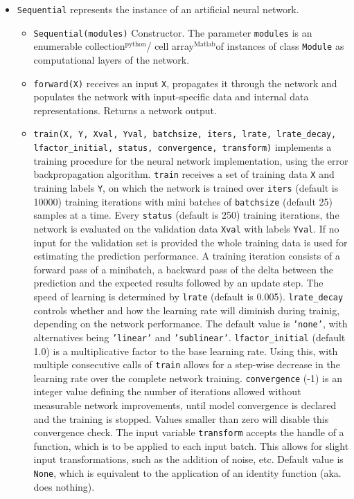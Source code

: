 \documentclass[a4wide]{article}
\newcommand{\mat}{$^\text{Matlab}$}
\newcommand{\py}{$^\text{python}$}
\begin{document}
\begin{itemize}
\begin{itemize}
		\item \texttt{Sequential} represents the instance of an artificial neural network.
			\begin{itemize}
				\item \texttt{Sequential(modules)} Constructor. The parameter \texttt{modules} is an enumerable collection\py / cell array\mat of instances of class \texttt{Module} as computational layers of the network.

				\item \texttt{forward(X)} receives an input \texttt{X}, propagates it through the network and populates the network with input-specific data and internal data representations. Returns a network output.

				\item \texttt{train(X, Y, Xval, Yval, batchsize, iters, lrate, lrate\_decay, lfactor\_initial, status, convergence, transform)} implements a training procedure for the neural network implementation, using the error backpropagation algorithm. \texttt{train} receives a set of training data \texttt{X}		 and training labels  \texttt{Y},   on which the network is trained over \texttt{iters} (default is 10000) training iterations with mini batches of \texttt{batchsize} (default 25) samples at a time. Every \texttt{status} (default is 250) training iterations, the network is evaluated on the validation data \texttt{Xval} with labels \texttt{Yval}. If no input for the validation set is provided the whole training data is used for estimating the prediction performance. A training iteration consists of a forward pass of a minibatch, a backward pass of the delta between the prediction and the expected results followed by an update step. The speed of learning is determined by \texttt{lrate} (default is 0.005). \texttt{lrate\_decay} controls whether and how the learning rate will diminish during trainig, depending on the network performance. The default value is \texttt{'none'}, with alternatives being \texttt{'linear'} and \texttt{'sublinear'}. \texttt{lfactor\_initial} (default 1.0) is a multiplicative factor to the base learning rate. Using this, with multiple consecutive calls of \texttt{train} allows for a step-wise decrease in the learning rate over the complete network training. \texttt{convergence} (-1) is an integer value defining the number of iterations allowed without measurable network improvements, until model convergence is declared and the training is stopped. Values smaller than zero will disable this convergence check. The input variable \texttt{transform} accepts the handle of a function, which is to be applied to each input batch. This allows for slight input transformations, such as the addition of noise, etc. Default value is \texttt{None}, which is equivalent to the application of an identity function (aka. does nothing).

\end{itemize}
\end{itemize}
\end{itemize}
\end{document}

